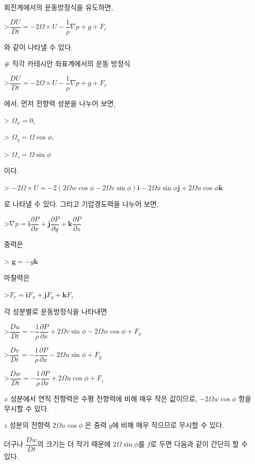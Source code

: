 회전계에서의 운동방정식을 유도하면,

>$ \dfrac{DU}{Dt} = -2 \Omega \times U - \dfrac{1}{\rho} \nabla p + g + F_{r} $

와 같이 나타낼 수 있다.



# 직각 카테시안 좌표계에서의 운동 방정식

>$ \dfrac{DU}{Dt} = -2 \Omega \times U - \dfrac{1}{\rho} \nabla p + g + F_{r} $ 

에서, 먼저 전향력 성분을 나누어 보면, 

> $ \Omega_{x} = 0$,

> $ \Omega_{y} = \Omega \cos \phi$, 

> $ \Omega_{z} = \Omega \sin \phi$ 

이다.

> $ -2 \Omega \times U  
= -2 \left( 2 \Omega w \cos \phi -2 \Omega v \sin \phi \right) \mathbf{i}
- 2 \Omega u \sin \phi \mathbf{j}
+ 2 \Omega u \cos \phi \mathbf{k}$

로 나타낼 수 있다. 그리고 기압경도력을 나누어 보면, 

>$ \nabla p = \mathbf{i} \dfrac{\partial P}{\partial x} 
+ \mathbf{j} \dfrac{\partial P}{\partial y}
+ \mathbf{k} \dfrac{\partial P}{\partial z}$

중력은 

> $ \mathbf{g} = -g \mathbf{k} $

마찰력은

>$ F_{r} = \mathbf{i} F_{x}
+ \mathbf{j} F_{y}
+ \mathbf{k} F_{z}$

각 성분별로 운동방정식을 나타내면 

>$ \dfrac{Du}{Dt}
= - \dfrac{1}{\rho} \dfrac{\partial P}{\partial x} 
+ 2 \Omega v \sin \phi - 2 \Omega w \cos \phi 
+ F_{x} $

>$ \dfrac{Dv}{Dt}
= - \dfrac{1}{\rho} \dfrac{\partial P}{\partial x} 
- 2 \Omega u \sin \phi
+ F_{y} $

>$ \dfrac{Dw}{Dt}
= - \dfrac{1}{\rho} \dfrac{\partial P}{\partial x} 
+ 2 \Omega u \cos \phi 
+ F_{z}$

$x$ 성분에서 연직 전향력은 수평 전향력에 비해 매우 작은 값이므로, $- 2 \Omega w \cos \phi $ 항을 무시할 수 있다. 

$z$ 성분의 전향력 $ 2 \Omega u \cos \phi $ 은 중력 $g$에 비해 매우 작으므로 무시할 수 있다. 

더구나 $ \dfrac{Dw}{Dt}$의 크기는 더 작기 때문에 $ 2 \Omega \sin \phi $를 $f$로 두면 다음과 같이 간단히 할 수 있다.

